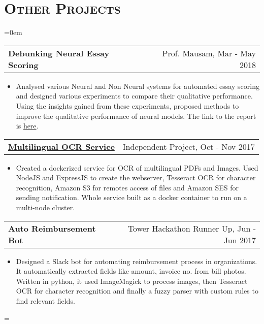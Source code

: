 \documentclass{article}
\makeatletter
\newenvironment{longversion}{}{} %
\newenvironment{absolutelynopagebreak}
  {\par\nobreak\vfil\penalty0\vfilneg
   \vtop\bgroup}
  {\par\xdef\tpd{\the\prevdepth}\egroup
   \prevdepth=\tpd}
\newcommand{\headerrow}[2]
{\begin{tabular*}{\linewidth}{l@{\extracolsep{\fill}}r}
	#1 &
	#2 \\
\end{tabular*}}
\newcommand{\tmpsection}[1]{}
\let\tmpsection=\section
\renewcommand{\section}[1]{\tmpsection*{\textsc{#1}}}
\makeatother
\begin{document}
\begin{absolutelynopagebreak}
\begin{longversion}
\section{Other Projects}
\begin{list} {}{\leftmargin=0em}
\setlength{\leftmargin}{0pt}


\item[]
\headerrow {\textbf{Debunking Neural Essay Scoring}}{Prof. Mausam, Mar - May 2018}
\begin{itemize} \item[] 
Analysed various Neural and Non Neural systems for automated essay scoring and designed various experiments to compare their qualitative performance. Using the insights gained from these experiments, proposed methods to improve the qualitative performance of neural models. The link to the report is \href{https://www.cse.iitd.ac.in/~cs1150262/nlp.pdf}{here}.
\end{itemize}

\item[]
\headerrow {\textbf{\href{https://github.com/ozym4nd145/ocr_web}{Multilingual OCR Service}}}{Independent Project, Oct - Nov 2017}
\begin{itemize} \item[] 
Created a dockerized service for OCR of multilingual PDFs and Images. Used NodeJS and ExpressJS to create the webserver, Tesseract OCR for character recognition, Amazon S3 for remotes access of files and Amazon SES for sending notification. Whole service built as a docker container to run on a multi-node cluster.
\end{itemize}


\item[]
\headerrow {\textbf{Auto Reimbursement Bot}}{Tower Hackathon Runner Up, Jun - Jun 2017}
\begin{itemize} \item[] 
Designed a Slack bot for automating reimbursement process in organizations. It automatically extracted fields like amount, invoice no. from bill photos. Written in python, it used ImageMagick to process images, then Tesseract OCR for character recognition and finally a fuzzy parser with custom rules to find relevant fields.
\end{itemize}


\end{list}
\end{longversion}
\end{absolutelynopagebreak}
\end{document}
